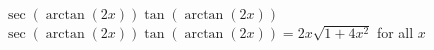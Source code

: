  {$\sec(\arctan(2x))\tan(\arctan(2x))$}
{ $\sec(\arctan(2x))\tan(\arctan(2x)) = 2x \sqrt{1+4x^2}$ for all $x$}

